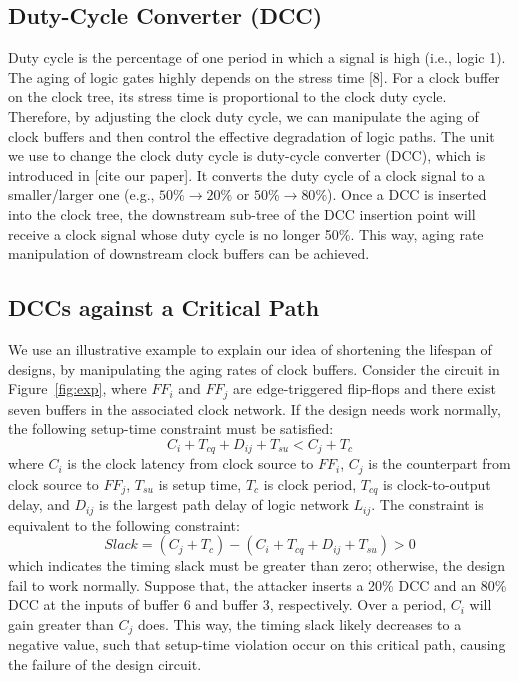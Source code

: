 \subsection{Duty-Cycle Converter (DCC)}
Duty cycle is the percentage of one period in which a signal is high (i.e., logic 1). The aging of logic gates highly depends on the stress time [8]. For a clock buffer on the clock tree, its stress time is proportional to the clock duty cycle. Therefore, by adjusting the clock duty cycle, we can manipulate the aging of clock buffers and then control the effective degradation of logic paths. The unit we use to change the clock duty cycle is duty-cycle converter (DCC), which is introduced in [cite our paper]. It converts the duty cycle of a clock signal to a smaller/larger one (e.g., $50\% \rightarrow 20\%$ or $50\% \rightarrow 80\%$). Once a DCC is inserted into the clock tree, the downstream sub-tree of the DCC insertion point will receive a clock signal whose duty cycle is no longer 50\%. This way, aging rate manipulation of downstream clock buffers can be achieved.
\subsection{DCCs against a Critical Path}
We use an illustrative example to explain our idea of shortening the lifespan of designs, by manipulating the aging rates of clock buffers. Consider the circuit in Figure~\ref{fig:exp}, where $FF_{i}$ and $FF_{j}$ are edge-triggered flip-flops and there exist seven buffers in the associated clock network. If the design needs work normally, the following setup-time constraint must be satisfied:
\begin{equation}
	\label{eq:setup}
	C_{i} + T_{cq} + D_{ij} + T_{su} < C_{j} + T_{c}
\end{equation}
where $C_{i}$ is the clock latency from clock source to $FF_{i}$, $C_{j}$ is the counterpart from clock source to $FF_{j}$, $T_{su}$ is setup time, $T_{c}$ is clock period, $T_{cq}$ is clock-to-output delay, and $D_{ij}$ is the largest path delay of logic network $L_{ij}$. The constraint is equivalent to the following constraint: 
\begin{equation}
	\label{eq:setup}
	Slack = (C_{j} + T_{c}) - (C_{i}  + T_{cq} + D_{ij} + T_{su}) > 0 
\end{equation}
which indicates the timing slack must be greater than zero; otherwise, the design fail to work normally. Suppose that, the attacker inserts a 20\% DCC and an 80\% DCC at the inputs of buffer 6 and buffer 3, respectively. Over a period, $C_{i}$ will gain greater than $C_{j}$ does. This way, the timing slack likely decreases to a negative value, such that setup-time violation occur on this critical path, causing the failure of the design circuit.